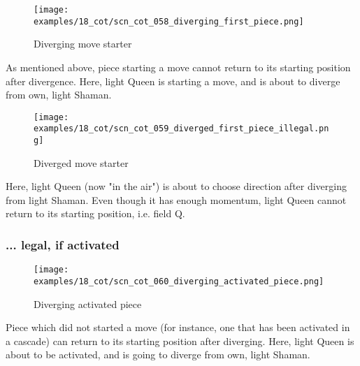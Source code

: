 \vspace*{-0.9\baselineskip}
\noindent
\begin{wrapfigure}[6]{l}{0.4\textwidth}
\centering
\texttt{[image: examples/18\_cot/scn\_cot\_058\_diverging\_first\_piece.png]}
\vspace*{-0.4\baselineskip}
\caption{Diverging move starter}
\label{fig:scn_cot_058_diverging_first_piece}
\end{wrapfigure}
As mentioned above, piece starting a move cannot return to its starting position
after divergence. \newline
\indent
Here, light Queen is starting a move, and is about to diverge from own, light Shaman.

\vspace*{3.9\baselineskip}
\noindent
\begin{wrapfigure}[6]{l}{0.4\textwidth}
\centering
\texttt{[image: examples/18\_cot/scn\_cot\_059\_diverged\_first\_piece\_illegal.png]}
\vspace*{-0.4\baselineskip}
\caption{Diverged move starter}
\label{fig:scn_cot_059_diverged_first_piece_illegal}
\end{wrapfigure}
Here, light Queen (now "in the air") is about to choose direction after diverging
from light Shaman. Even though it has enough momentum, light Queen cannot return
to its starting position, i.e. field Q.

\clearpage %

\subsubsection*{... legal, if activated}
\label{sec:Conquest of Tlalocan/Divergence/Diverging to starting position/... legal, if activated}

\vspace*{-0.9\baselineskip}
\noindent
\begin{wrapfigure}[7]{l}{0.4\textwidth}
\centering
\texttt{[image: examples/18\_cot/scn\_cot\_060\_diverging\_activated\_piece.png]}
\vspace*{-0.4\baselineskip}
\caption{Diverging activated piece}
\label{fig:scn_cot_060_diverging_activated_piece}
\end{wrapfigure}
Piece which did not started a move (for instance, one that has been activated
in a cascade) can return to its starting position after diverging. \newline
\indent
Here, light Queen is about to be activated, and is going to diverge from own,
light Shaman.


